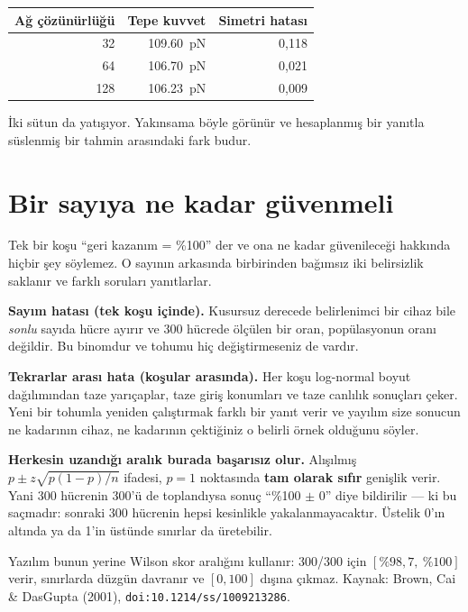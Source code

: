 \documentclass[11pt,a4paper]{article}
\begin{document}
\begin{center}\small
\begin{tabular}{rrr}
\toprule
\textbf{Ağ çözünürlüğü} & \textbf{Tepe kuvvet} & \textbf{Simetri hatası} \\
\midrule
32  & \SI{109,60}{\pico\newton} & 0,118 \\
64  & \SI{106,70}{\pico\newton} & 0,021 \\
128 & \SI{106,23}{\pico\newton} & 0,009 \\
\bottomrule
\end{tabular}
\end{center}

İki sütun da yatışıyor. Yakınsama böyle görünür ve hesaplanmış bir yanıtla
süslenmiş bir tahmin arasındaki fark budur.

\section{Bir sayıya ne kadar güvenmeli}
\label{sec:uncertainty}

Tek bir koşu ``geri kazanım = \%100'' der ve ona ne kadar güvenileceği hakkında
hiçbir şey söylemez. O sayının arkasında birbirinden bağımsız iki belirsizlik
saklanır ve farklı soruları yanıtlarlar.

\textbf{Sayım hatası (tek koşu içinde).} Kusursuz derecede belirlenimci bir cihaz
bile \emph{sonlu} sayıda hücre ayırır ve 300 hücrede ölçülen bir oran,
popülasyonun oranı değildir. Bu binomdur ve tohumu hiç değiştirmeseniz de vardır.

\textbf{Tekrarlar arası hata (koşular arasında).} Her koşu log-normal boyut
dağılımından taze yarıçaplar, taze giriş konumları ve taze canlılık sonuçları
çeker. Yeni bir tohumla yeniden çalıştırmak farklı bir yanıt verir ve yayılım
size sonucun ne kadarının cihaz, ne kadarının çektiğiniz o belirli örnek olduğunu
söyler.

\begin{warnbox}
\textbf{Herkesin uzandığı aralık burada başarısız olur.} Alışılmış
$p \pm z\sqrt{p(1-p)/n}$ ifadesi, $p = 1$ noktasında \textbf{tam olarak sıfır}
genişlik verir. Yani 300 hücrenin 300'ü de toplandıysa sonuç ``\%100 $\pm$ 0''
diye bildirilir --- ki bu saçmadır: sonraki 300 hücrenin hepsi kesinlikle
yakalanmayacaktır. Üstelik 0'ın altında ya da 1'in üstünde sınırlar da
üretebilir.

Yazılım bunun yerine Wilson skor aralığını kullanır: 300/300 için
$[\%98{,}7,\ \%100]$ verir, sınırlarda düzgün davranır ve $[0, 100]$ dışına
çıkmaz. Kaynak: Brown, Cai \& DasGupta (2001),
\texttt{doi:10.1214/ss/1009213286}.
\end{warnbox}
\end{document}
